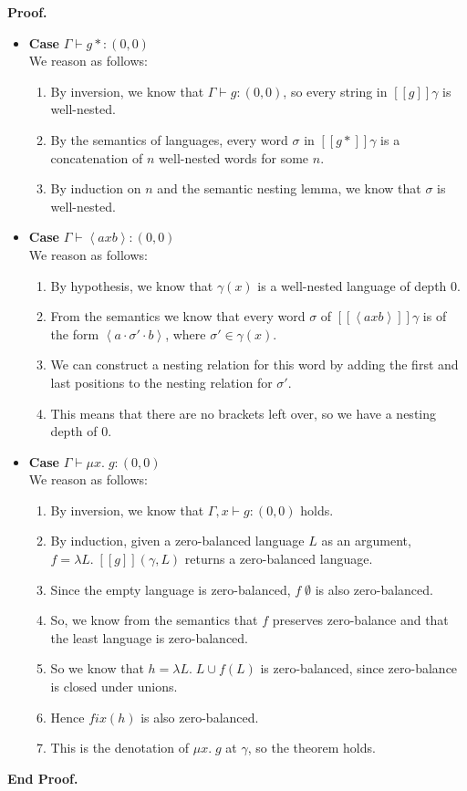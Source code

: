 \documentclass{article}
\newcommand{\fix}[2]{\mu {#1}.\;{#2}}
\newcommand{\lft}[1]{\left<{#1}\right.}
\newcommand{\rgt}[1]{\left.{#1}\right>}
\newcommand{\judgebalance}[3][\Gamma]{{#1} \vdash {#2} : {#3}}
\newcommand{\zero}{(0,0)}
\newcommand{\interp}[1]{[\![{#1}]\!]}
\newcommand{\fun}[2]{\lambda {#1}.\;{#2}}
\newenvironment{proof}{\noindent\textbf{Proof.}}{\noindent\textbf{End Proof.}}
\newenvironment{caseblock}{\begin{itemize}}{\end{itemize}}
\newenvironment{case}[1]{\item \textbf{Case} {#1}\\}{}
\begin{document}
\begin{proof}
\begin{caseblock}
  \begin{case}{$\judgebalance{g*}{\zero}$}
    We reason as follows: 
    \begin{enumerate}
      \item By inversion, we know that $\judgebalance{g}{\zero}$, so every string in $\interp{g}\gamma$ is 
        well-nested. 
      \item By the semantics of languages, every word $\sigma$ in $\interp{g*}\gamma$ is a concatenation of 
        $n$ well-nested words for some $n$. 
      \item By induction on $n$ and the semantic nesting lemma, we know that $\sigma$ is well-nested. 
    \end{enumerate}
  \end{case}

  \begin{case}{$\judgebalance{\lft{a}x\rgt{b}}{\zero}$}
    We reason as follows: 
    \begin{enumerate}
      \item By hypothesis, we know that $\gamma(x)$ is a well-nested language of depth 0. 
      \item From the semantics we know that every word $\sigma$ of $\interp{\lft{a}x\rgt{b}}\gamma$ is 
        of the form $\lft{a}\cdot\sigma'\cdot\rgt{b}$, where $\sigma' \in \gamma(x)$. 
      \item We can construct a nesting relation for this word by adding the first and last positions 
        to the nesting relation for $\sigma'$. 
      \item This means that there are no brackets left over, so we have a nesting depth of 0. 
    \end{enumerate}
  \end{case}

  \begin{case}{$\judgebalance{\fix{x}{g}}{\zero}$}
    We reason as follows: 
    \begin{enumerate}
      \item By inversion, we know that $\judgebalance[\Gamma, x]{g}{\zero}$ holds. 
      \item By induction, given a zero-balanced language $L$ as an argument, $f = \fun{L}{\interp{g}(\gamma,L)}$
        returns a zero-balanced language. 
      \item Since the empty language is zero-balanced, $f\;\emptyset$ is
        also zero-balanced. 
      \item So, we know from the semantics that $f$ preserves zero-balance and that the least language is zero-balanced. 
      \item So we know that $h = \fun{L}{L \cup f(L)}$ is zero-balanced, since zero-balance is closed under unions. 
      \item Hence $\mathit{fix}(h)$ is also zero-balanced. 
      \item This is the denotation of $\fix{x}{g}$ at $\gamma$, so the theorem holds. 
    \end{enumerate}
  \end{case}


\end{caseblock}
\end{proof}
\end{document}
